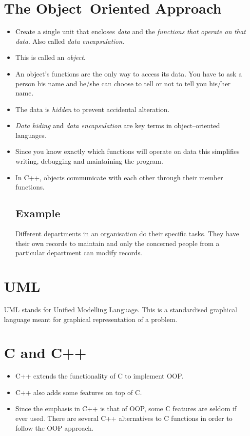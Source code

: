 \documentclass[12pt,a4paper]{article}
\begin{document}
\section{The Object--Oriented Approach}
\begin{itemize}
\item Create a single unit that encloses \textit{data} and the \textit{functions that operate on that data}. Also called \textit{data encapsulation}.
\item This is called an \textit{object}.
\item An object's functions are the only way to access its data. You have to ask a person his name and he/she can choose to tell or not to tell you his/her name.
\item The data is \textit{hidden} to prevent accidental alteration.
\item \textit{Data hiding} and \textit{data encapsulation} are key terms in object--oriented languages.
\item Since you know exactly which functions will operate on data this simplifies writing, debugging and maintaining the program.
\item In C++, objects communicate with each other through their member functions.
\subsection{Example}
Different departments in an organisation do their specific tasks. They have their own records to maintain and only the concerned people from a particular department can modify records.
\end{itemize}
\section{UML}
UML stands for Unified Modelling Language. This is a standardised graphical language meant for graphical representation of a problem.
\section{C and C++}
\begin{itemize}
\item C++ extends the functionality of C to implement OOP.
\item C++ also adds some features on top of C.
\item Since the emphasis in C++ is that of OOP, some C features are seldom if ever used. There are several C++ alternatives to C functions in order to follow the OOP approach.
\end{itemize}
\end{document}
